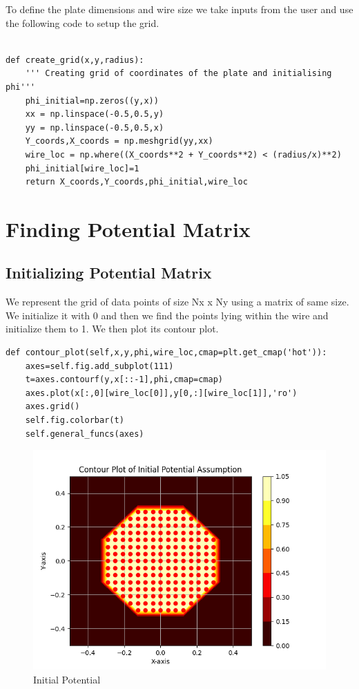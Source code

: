 \documentclass{article}
\begin{document}
To define the plate dimensions and wire size we take inputs from the user and use the following
code to setup the grid.
\begin{lstlisting}

def create_grid(x,y,radius):    
    ''' Creating grid of coordinates of the plate and initialising phi'''
    phi_initial=np.zeros((y,x))
    xx = np.linspace(-0.5,0.5,y)
    yy = np.linspace(-0.5,0.5,x)
    Y_coords,X_coords = np.meshgrid(yy,xx)
    wire_loc = np.where((X_coords**2 + Y_coords**2) < (radius/x)**2)
    phi_initial[wire_loc]=1
    return X_coords,Y_coords,phi_initial,wire_loc

\end{lstlisting}


\section{Finding Potential Matrix}
\subsection{ Initializing Potential Matrix}
We represent the grid of data points of size Nx x Ny using a matrix of same size. 
We initialize it with 0 and then we find the points lying within the wire and initialize them to 1. We then plot its contour plot.
\begin{lstlisting}
def contour_plot(self,x,y,phi,wire_loc,cmap=plt.get_cmap('hot')):
    axes=self.fig.add_subplot(111)
    t=axes.contourf(y,x[::-1],phi,cmap=cmap)
    axes.plot(x[:,0][wire_loc[0]],y[0,:][wire_loc[1]],'ro')
    axes.grid()
    self.fig.colorbar(t)
    self.general_funcs(axes)
\end{lstlisting}
\begin{figure}[h!]
\centering
\includegraphics[scale=0.6]{plots/Contour Plot of Initial Potential Assumption.png}
\caption{Initial Potential}
\label{fig:initial Potential}
\end{figure}
\end{document}
